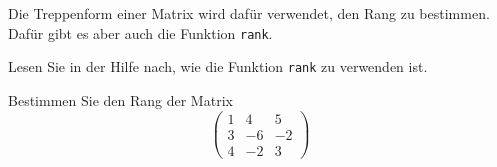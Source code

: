 Die Treppenform einer Matrix wird dafür verwendet, den Rang zu
bestimmen. Dafür gibt es aber auch die Funktion {\tt rank}.
\begin{teilaufgaben}
\item Lesen Sie in der Hilfe nach, wie die Funktion {\tt rank}
zu verwenden ist.
\item Bestimmen Sie den Rang der Matrix
\[
\begin{pmatrix}
1&4&5\\
3&-6&-2\\
4&-2&3
\end{pmatrix}
\]
\end{teilaufgaben}

\begin{loesung}
\begin{teilaufgaben}
\item
\item
{}
\end{teilaufgaben}
\end{loesung}

